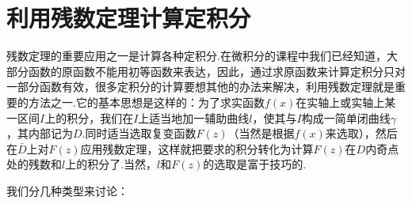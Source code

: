 \section{利用残数定理计算定积分\label{sec5.5}}
残数定理的重要应用之一是计算各种定积分.在微积分的课程中我们已经知道，大部分函数的原函数不能用初等函数来表达，因此，通过求原函数来计算定积分只对一部分函数有效，很多定积分的计算要想其他的办法来解决，利用残数定理就是重要的方法之一.它的基本思想是这样的：为了求实函数$f(x)$在实轴上或实轴上某一区间$I$上的积分，我们在$I$上适当地加一辅助曲线$l$，使其与$I$构成一简单闭曲线$\gamma$，其内部记为$D$.同时适当选取复变函数$F(z)$（当然是根据$f(x)$来选取），然后在$\bar D$上对$F(z)$应用残数定理，这样就把要求的积分转化为计算$F(z)$在$D$内奇点处的残数和$l$上的积分了.当然，$l$和$F(z)$的选取是富于技巧的.

我们分几种类型来讨论：

